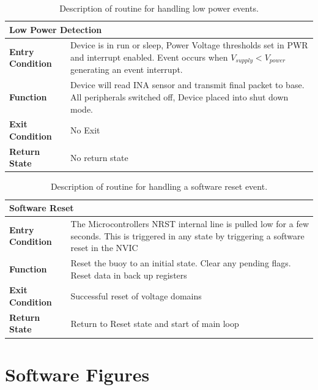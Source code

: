 \begin{table}[H]
    \centering
    \caption{Description of routine for handling low power events.}
    \begin{tabular}{|m{}|m{}|}
    \hline
    \multicolumn{2}{|l|}{\textbf{Low Power Detection}} \\
    \hline
    \textbf{Entry Condition}  & Device is in run or sleep, Power Voltage thresholds set in PWR and interrupt enabled. Event occurs when $V_{supply} < V_{power}$ generating an event interrupt. \\
    \hline
    \textbf{Function} & Device will read INA sensor and transmit final packet to base. All peripherals switched off, Device placed into shut down mode.\\
    \hline
    \textbf{Exit Condition} & No Exit\\
    \hline
    \textbf{Return State} & No return state\\
    \hline
    \end{tabular}

    \label{tab:Ev_desc_LPD}
\end{table}

\begin{table}[H]
    \centering
    \caption{Description of routine for handling a software reset event.}
    \begin{tabular}{|m{}|m{}|}
    \hline
    \multicolumn{2}{|l|}{\textbf{Software Reset}} \\
    \hline
    \textbf{Entry Condition}  & The Microcontrollers NRST internal line is pulled low for a few seconds. This is triggered in any state by triggering a software reset in the NVIC\\
    \hline
    \textbf{Function} & Reset the buoy to an initial state. Clear any pending flags. Reset data in back up registers\\
    \hline
    \textbf{Exit Condition} & Successful reset of voltage domains\\
    \hline
    \textbf{Return State} & Return to Reset state and start of main loop\\
    \hline
    \end{tabular}

    \label{tab:Ev_desc_SWR}
\end{table}


\chapter{Software Figures}

